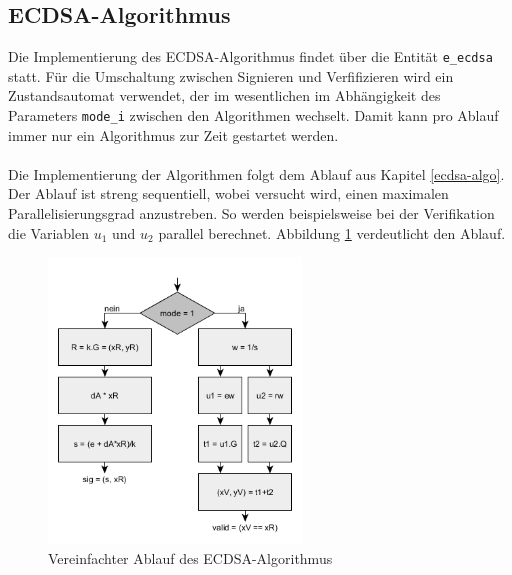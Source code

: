 \subsection{ECDSA-Algorithmus}

Die Implementierung des ECDSA-Algorithmus findet über die Entität \texttt{e\_ecdsa} statt. Für die Umschaltung zwischen Signieren und Verfifizieren wird ein Zustandsautomat verwendet, der im wesentlichen im Abhängigkeit des Parameters \texttt{mode\_i} zwischen den Algorithmen wechselt. Damit kann pro Ablauf immer nur ein Algorithmus zur Zeit gestartet werden.
\\ \\
Die Implementierung der Algorithmen folgt dem Ablauf aus Kapitel \ref{ecdsa-algo}. Der Ablauf ist streng sequentiell, wobei versucht wird, einen maximalen Parallelisierungsgrad anzustreben. So werden beispielsweise bei der Verifikation die Variablen $u_1$ und $u_2$ parallel berechnet. Abbildung \ref{fig:vhdl-impl-ecdsa} verdeutlicht den Ablauf.

\begin{figure}[thb]
	\centering
	\includegraphics[width=0.6\textwidth]{bilder/vhdl_ecdsa.png}
	\caption{Vereinfachter Ablauf des ECDSA-Algorithmus}
	\label{fig:vhdl-impl-ecdsa}
\end{figure}

